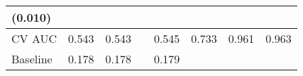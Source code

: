 \documentclass[12pt,twoside]{reedthesis}
\begin{document}
\begin{longtable}[]{@{}lccccccc@{}}
\begin{minipage}[t]{0.10\columnwidth}
  (0.010)\strut
  \end{minipage} & \begin{minipage}[t]{0.10\columnwidth}\centering\strut
  \strut
  \end{minipage} & \begin{minipage}[t]{0.10\columnwidth}\centering\strut
  \strut
  \end{minipage}\tabularnewline
  \midrule
  \begin{minipage}[t]{0.12\columnwidth}\raggedright\strut
  CV AUC\strut
  \end{minipage} & \begin{minipage}[t]{0.09\columnwidth}\centering\strut
  0.543\strut
  \end{minipage} & \begin{minipage}[t]{0.10\columnwidth}\centering\strut
  0.543\strut
  \end{minipage} & \begin{minipage}[t]{0.10\columnwidth}\centering\strut
  \strut
  \end{minipage} & \begin{minipage}[t]{0.10\columnwidth}\centering\strut
  0.545\strut
  \end{minipage} & \begin{minipage}[t]{0.10\columnwidth}\centering\strut
  0.733\strut
  \end{minipage} & \begin{minipage}[t]{0.10\columnwidth}\centering\strut
  0.961\strut
  \end{minipage} & \begin{minipage}[t]{0.10\columnwidth}\centering\strut
  0.963\strut
  \end{minipage}\tabularnewline
  \begin{minipage}[t]{0.12\columnwidth}\raggedright\strut
  Baseline\strut
  \end{minipage} & \begin{minipage}[t]{0.09\columnwidth}\centering\strut
  0.178\strut
  \end{minipage} & \begin{minipage}[t]{0.10\columnwidth}\centering\strut
  0.178\strut
  \end{minipage} & \begin{minipage}[t]{0.10\columnwidth}\centering\strut
  \strut
  \end{minipage} & \begin{minipage}[t]{0.10\columnwidth}\centering\strut
  0.179\strut
  \end{minipage} & \begin{minipage}[t]{0.10\columnwidth}\centering\strut

\end{minipage}
\end{longtable}
\end{document}
